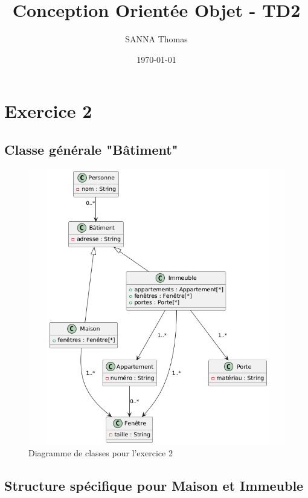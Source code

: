 \documentclass{article}
\begin{document}
\title{Conception Orientée Objet - TD2}
\author{SANNA Thomas}
\date{\today}

\maketitle

\section*{Exercice 2}

\subsection{Classe générale "Bâtiment"}

\begin{figure}[H]
  \centering
  \includegraphics[width=\textwidth]{exo2-1.png}
  \caption{Diagramme de classes pour l'exercice 2}
\end{figure}

\subsection{Structure spécifique pour Maison et Immeuble}
\end{document}
